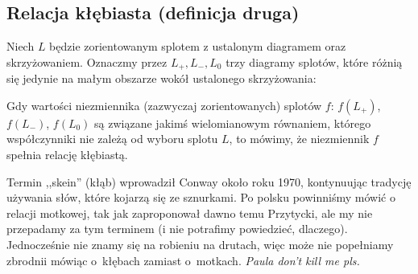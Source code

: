 
\subsection{Relacja kłębiasta (definicja druga)}

\begin{definition}
\label{skein_symbols}%
%
    Niech $L$ będzie zorientowanym splotem z ustalonym diagramem oraz skrzyżowaniem.
    Oznaczmy przez $L_+, L_-, L_0$ trzy diagramy splotów, które różnią się jedynie na małym obszarze wokół ustalonego skrzyżowania:
\begin{comment}
    \begin{figure}[H]
        \centering
        \begin{minipage}[b]{.3\linewidth}
            \centering
            \[\LargePlusCrossingArrows\]
            \subcaption{$L_+$}
        \end{minipage}
        \begin{minipage}[b]{.3\linewidth}
            \centering
            \[\LargeMinusCrossingArrows\]
            \subcaption{$L_-$}
        \end{minipage}
        \begin{minipage}[b]{.3\linewidth}
            \centering
            \[\LargeJustSmoothing\]
            \subcaption{$L_0$}
        \end{minipage}
    \end{figure}
\end{comment}
\noindent
Gdy wartości niezmiennika (zazwyczaj zorientowanych) splotów $f$: $f(L_+)$, $f(L_-)$, $f(L_0)$ są związane jakimś wielomianowym równaniem, którego współczynniki nie zależą od wyboru splotu $L$, to mówimy, że niezmiennik $f$ spełnia relację kłębiastą.
\end{definition}

Termin ,,skein'' (kłąb) wprowadził Conway około roku 1970, kontynuując tradycję używania słów, które kojarzą się ze sznurkami.
%
Po polsku powinniśmy mówić o relacji motkowej, tak jak zaproponował dawno temu Przytycki, ale my nie przepadamy za tym terminem (i nie potrafimy powiedzieć, dlaczego).
Jednocześnie nie znamy się na robieniu na drutach, więc może nie popełniamy zbrodnii mówiąc o~kłębach zamiast o~motkach.
\emph{Paula don't kill me pls.}

